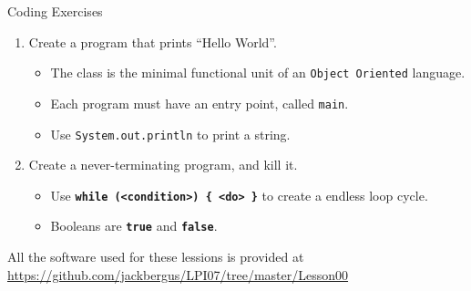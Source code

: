 \documentclass{beamer}
\begin{document}
\begin{frame}{Coding Exercises}
	\begin{enumerate}
		\item Create a program that prints ``Hello World''.
		\begin{itemize}
			\item The class is the minimal functional unit of an \texttt{Object Oriented} language.
			\item Each program must have an entry point, called \texttt{main}.
			\item Use \texttt{System.out.println} to print a string.
		\end{itemize}
		\item Create a never-terminating program, and kill it.
		\begin{itemize}
			\item Use \texttt{\textbf{while (<condition>) \{ <do> \}}} to create a endless loop cycle.
			\item Booleans are \texttt{\textbf{true}} and \texttt{\textbf{false}}.
		\end{itemize}
	\end{enumerate}


All the software used for these lessions is provided at \url{https://github.com/jackbergus/LPI07/tree/master/Lesson00}
\end{frame}
\end{document}
